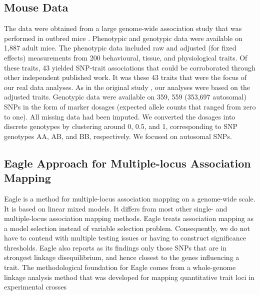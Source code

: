\documentclass{article}
\begin{document}
\subsection{Mouse Data}

The data were obtained from a large genome-wide association study that was performed in outbred mice \cite{nicod2016genome}. 
Phenotypic and genotypic data were available on 1,887 adult mice. 
The phenotypic data included raw and adjusted (for fixed effects) measurements from 200 behavioural, tissue, and physiological traits.  
Of these traits, 
43 yielded SNP-trait associations that could be corroborated through other independent published work. It was these 
43 traits that were the focus of our real data analyses. As in the original study  \cite{nicod2016genome}, our analyses 
were based on the adjusted traits.
Genotypic data were available on 359, 559 (353,697 autosomal) SNPs in the 
form of marker dosages (expected allele counts that ranged from zero to one). All missing data had been imputed. 
We converted the dosages into discrete genotypes 
by clustering around 0, 0.5, and 1, corresponding to SNP genotypes AA, AB, and BB, respectively. We focused on autosomal SNPs.




\subsection{Eagle Approach for Multiple-locus Association Mapping}

Eagle is a method for multiple-locus association mapping on a genome-wide scale. It is based on linear mixed models. It differs from most other single- and multiple-locus association mapping methods. Eagle treats association mapping as a model selection instead of variable selection problem. Consequently,  we do not have to contend with multiple testing issues or having to construct significance thresholds.  
Eagle also 
reports as its findings only those SNPs that are in strongest linkage disequilibrium, and hence closest to the genes influencing a trait. 
The methodological foundation for Eagle comes from a whole-genome linkage analysis method that was developed for mapping 
quantitative trait loci in experimental crosses \cite{verbyla2007analysis} 
\end{document}

